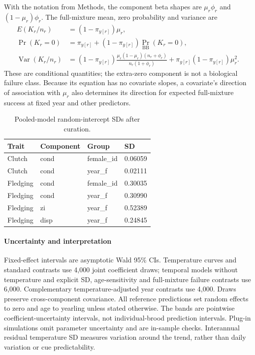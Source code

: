 \documentclass{article}
\begin{document}
With the notation from Methods, the component beta shapes are $\mu_r\phi_r$ and $(1-\mu_r)\phi_r$. The full-mixture mean, zero probability and variance are
\begin{align}
E(K_r/n_r)&=(1-\pi_{y[r]})\mu_r,\\
\Pr(K_r=0)&=\pi_{y[r]}+(1-\pi_{y[r]})\Pr_{\mathrm{BB}}(K_r=0),\\
\operatorname{Var}(K_r/n_r)&=(1-\pi_{y[r]})\frac{\mu_r(1-\mu_r)(n_r+\phi_r)}{n_r(1+\phi_r)}
+\pi_{y[r]}(1-\pi_{y[r]})\mu_r^2.
\end{align}
These are conditional quantities; the extra-zero component is not a biological failure class. Because its equation has no covariate slopes, a covariate's direction of association with $\mu_r$ also determines its direction for expected full-mixture success at fixed year and other predictors.

\begin{table}[!ht]\centering\scriptsize\singlespacing
\caption{Pooled-model random-intercept SDs after curation.}\label{tab:pooled-random}
\begin{tabular}{llll}\toprule
Trait & Component & Group & SD\\\midrule
Clutch & cond & female\_id & 0.06059\\
Clutch & cond & year\_f & 0.02111\\
Fledging & cond & female\_id & 0.30035\\
Fledging & cond & year\_f & 0.30990\\
Fledging & zi & year\_f & 0.52389\\
Fledging & disp & year\_f & 0.24845\\
\bottomrule\end{tabular}\end{table}

\paragraph{Uncertainty and interpretation}
Fixed-effect intervals are asymptotic Wald 95\% CIs. Temperature curves and standard contrasts use 4,000 joint coefficient draws; temporal models without temperature and explicit SD, age-sensitivity and full-mixture failure contrasts use 6,000. Complementary temperature-adjusted year contrasts use 4,000. Draws preserve cross-component covariance. All reference predictions set random effects to zero and age to yearling unless stated otherwise. The bands are pointwise coefficient-uncertainty intervals, not individual-brood prediction intervals. Plug-in simulations omit parameter uncertainty and are in-sample checks. Interannual residual temperature SD measures variation around the trend, rather than daily variation or cue predictability.
\end{document}
